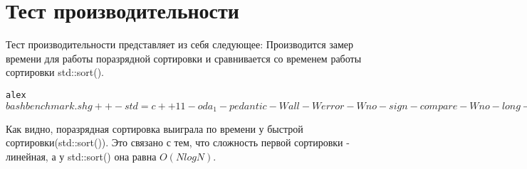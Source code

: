 \section{Тест производительности}

Тест производительности представляет из себя следующее: Производится замер времени для работы поразрядной сортировки и сравнивается со временем работы сортировки std::sort().

\begin{alltt}
alex$ bash benchmark.sh 
g++ -std=c++11 -o da_1 -pedantic -Wall -Werror -Wno-sign-compare -Wno-long-long -lm main.cpp sort.cpp 
Time for Radix Sort

real	0m20.225s
user	0m19.748s
sys		0m0.472s
Time for std::sort()

real	0m28.851s
user	0m27.836s
sys		0m1.000s
alex$
\end{alltt}
Как видно, поразрядная сортировка выиграла по времени у быстрой сортировки(std::sort()). Это связано с тем, что сложность первой сортировки - линейная, а у std::sort() она равна $O(NlogN)$.
\pagebreak
